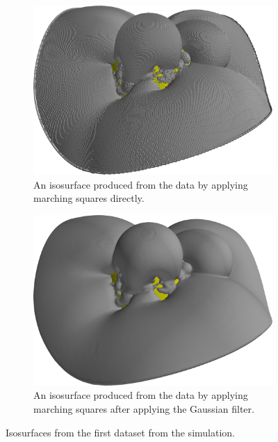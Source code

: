 \documentclass[a4paper,10pt]{report}
\begin{document}
\begin{figure}[H]
    \centering
    \begin{subfigure}{.49\textwidth}
        \includegraphics[width=\textwidth]{../images/3D/Dataset1.png}
    \caption{An isosurface produced from the data by applying marching squares directly.}
    \end{subfigure}
    \hfill
    \begin{subfigure}{.49\textwidth}
        \includegraphics[width=\textwidth]{../images/3D/Dataset1_Gaussian.png}
    \caption{An isosurface produced from the data by applying marching squares after applying the Gaussian filter.}
    \end{subfigure}
    \caption{Isosurfaces from the first dataset from the simulation.}
    \label{fig:Dataset1}
\end{figure}
\end{document}
